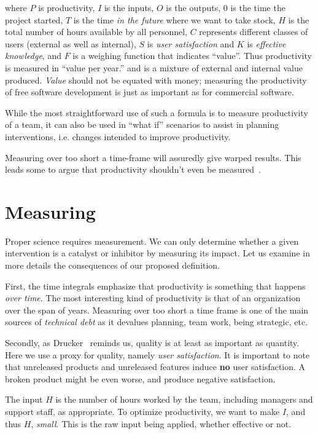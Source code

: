 \documentclass[sigconf, authorversion, nonacm]{acmart}
\begin{document}
\noindent where $P$ is productivity, $I$ is the inputs, $O$ is the outputs, $0$
is the time the project started, $T$ is the time \emph{in the future} where we
want to take stock, $H$ is the total number of hours available by all personnel,
$C$ represents different classes of users (external as well as internal), $S$ is
\emph{user satisfaction} and $K$ is \emph{effective knowledge}, and $F$ is a
weighing function that indicates ``value''.  Thus productivity is
measured in ``value per year.''  and is a mixture of external and internal
value produced. \emph{Value} should not be equated with money; measuring
the productivity of free software development is just as important as for
commercial software.

While the most straightforward use of such a formula is to measure productivity
of a team, it can also be used in ``what if'' scenarios to assist in planning
interventions, i.e. changes intended to improve productivity.

Measuring over too short a time-frame will assuredly give
warped results. This leads some to argue that productivity shouldn't even
be measured~\cite{Ko2019}.

\section{Measuring}

Proper science requires measurement.  We can only determine whether a given
intervention is a catalyst or inhibitor by measuring its impact.  Let us
examine in more details the consequences of our proposed definition.

First, the time integrals emphasize that productivity is something that
happens \emph{over time}. The most interesting kind of productivity is
that of an organization over the span of years. Measuring over too short
a time frame is one of the main sources of \emph{technical debt}%
\cite{techdept} as it devalues planning, team work, being strategic, etc.

Secondly, as Drucker~\cite{Drucker1999} reminds us, quality is at least as
important as quantity. Here we use a proxy for quality, namely
\emph{user satisfaction}. It is important to note that unreleased products
and unreleased features induce \textbf{no} user satisfaction. A broken
product might be even worse, and produce negative satisfaction.

The input $H$ is the number of hours worked by the team, including managers
and support staff, as appropriate. To optimize productivity, we want to
make $I$, and thus $H$, \emph{small}. This is the raw input being applied,
whether effective or not.
\end{document}
